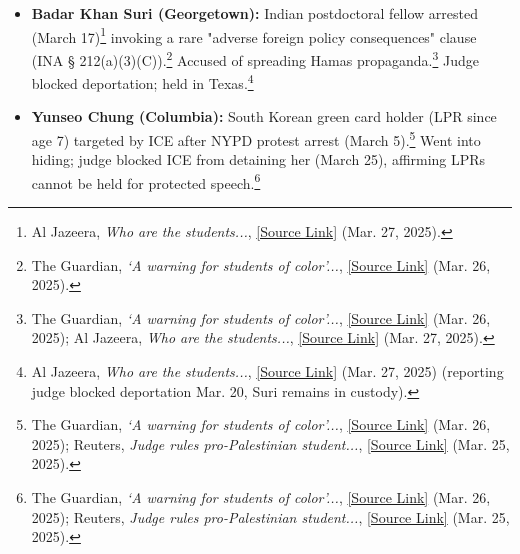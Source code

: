 \documentclass[11pt, letterpaper]{article}
\begin{document}
\begin{itemize}
        \item \textbf{Badar Khan Suri (Georgetown):} Indian postdoctoral fellow arrested (March 17)\footnote{Al Jazeera, \emph{Who are the students...}, \href{https://www.aljazeera.com/news/2025/3/27/who-are-the-students-trump-wants-to-deport\#:~:text=Badar\%20Khan\%20Suri}{[Source Link]} (Mar. 27, 2025).} invoking a rare "adverse foreign policy consequences" clause (INA § 212(a)(3)(C)).\footnote{The Guardian, \emph{‘A warning for students of color’...}, \href{https://www.theguardian.com/us-news/2025/mar/26/us-universities-students-israel-palestine-protests\#:~:text=In\%20the\%20case\%20of\%20Khalil,promoting\%20antisemitism\%20on\%20social\%20media\%E2\%80\%9D}{[Source Link]} (Mar. 26, 2025).} Accused of spreading Hamas propaganda.\footnote{The Guardian, \emph{‘A warning for students of color’...}, \href{https://www.theguardian.com/us-news/2025/mar/26/us-universities-students-israel-palestine-protests\#:~:text=activism\%2C\%20the\%20administration\%20cited\%20a,promoting\%20antisemitism\%20on\%20social\%20media\%E2\%80\%9D}{[Source Link]} (Mar. 26, 2025); Al Jazeera, \emph{Who are the students...}, \href{https://www.aljazeera.com/news/2025/3/27/who-are-the-students-trump-wants-to-deport\#:~:text=McLaughlin\%20attributed\%20Suri\%E2\%80\%99s\%20arrest\%20to,\%E2\%80\%9D}{[Source Link]} (Mar. 27, 2025).} Judge blocked deportation; held in Texas.\footnote{Al Jazeera, \emph{Who are the students...}, \href{https://www.aljazeera.com/news/2025/3/27/who-are-the-students-trump-wants-to-deport\#:~:text=However\%2C\%20the\%20Trump\%20administration\%20has,Semitism}{[Source Link]} (Mar. 27, 2025) (reporting judge blocked deportation Mar. 20, Suri remains in custody).}
        \item \textbf{Yunseo Chung (Columbia):} South Korean green card holder (LPR since age 7) targeted by ICE after NYPD protest arrest (March 5).\footnote{The Guardian, \emph{‘A warning for students of color’...}, \href{https://www.theguardian.com/us-news/2025/mar/26/us-universities-students-israel-palestine-protests\#:~:text=Yunseo\%20Chung\%2C\%20a\%2021,until\%20the\%20court\%20rules\%20otherwise}{[Source Link]} (Mar. 26, 2025); Reuters, \emph{Judge rules pro-Palestinian student...}, \href{https://www.reuters.com/legal/judge-rules-pro-palestinian-student-permanent-us-resident-cannot-be-detained-2025-03-25/\#:~:text=The\%20U,Hamas}{[Source Link]} (Mar. 25, 2025).} Went into hiding; judge blocked ICE from detaining her (March 25), affirming LPRs cannot be held for protected speech.\footnote{The Guardian, \emph{‘A warning for students of color’...}, \href{https://www.theguardian.com/us-news/2025/mar/26/us-universities-students-israel-palestine-protests\#:~:text=Yunseo\%20Chung\%2C\%20a\%2021,until\%20the\%20court\%20rules\%20otherwise}{[Source Link]} (Mar. 26, 2025); Reuters, \emph{Judge rules pro-Palestinian student...}, \href{https://www.reuters.com/legal/judge-rules-pro-palestinian-student-permanent-us-resident-cannot-be-detained-2025-03-25/\#:~:text=U,being\%20detained\%2C\%20court\%20records\%20showed}{[Source Link]} (Mar. 25, 2025).}

\end{itemize}
\end{document}
